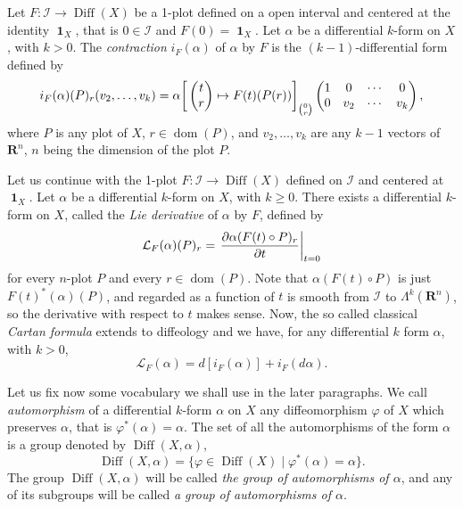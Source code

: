 \documentclass[10pt,reqno,twoside]{amsart}
\newcommand{\mymatrix}[1]{\begin{pmatrix} #1 \end{pmatrix}}
\newcommand{\RR}{\mathbf{R}}
\newcommand{\cI}{\mathcal{I}}
\DeclareMathOperator{\dom}{dom}
\DeclareMathOperator{\id}{\mathbf{1}}
\DeclareMathOperator{\Diff}{Diff}
\newcommand{\DLie}{\mathcal{L}} %
\theoremstyle{plain}
\theoremstyle{definition}
\begin{document}
  Let $F : \cI \to \Diff(X)$ be a 1-plot defined on a open interval and centered at the identity $\id_X$,
  that is $0 \in \cI$ and $F(0) = \id_X$.
  Let $\alpha$ be a differential $k$-form on $X$,
  with $k>0$.
  The {\em contraction} $i_{F}(\alpha)$ of $\alpha$ by $F$ is the $(k-1)$-differential form defined by
  $$
    i_{F}(\alpha)(P)_r(v_2, \ldots, v_{k}) =
    \alpha\bigg[\mymatrix{t \cr r} \mapsto
    F(t)(P(r))\bigg]_{0 \choose r} \mymatrix{1 &
    0 & \cdots & 0 \cr 0 &v_2 & \cdots & v_{k}},
    $$
  where $P$ is any plot of $X$,
  $r \in \dom(P)$,
  and $v_2,\ldots,v_{k}$ are any $k-1$ vectors of $\RR^n$,
  $n$ being the dimension of the plot $P$.
  
  Let us continue with the 1-plot $F : \cI \to \Diff(X)$ defined on $\cI$ and centered at $\id_X$.
  Let $\alpha$ be a differential $k$-form on $X$,
  with $k \geq 0$.
  There exists a differential $k$-form on $X$,
  called the {\em Lie derivative} of $\alpha$ by $F$,
  defined by
  $$
    \DLie_F(\alpha)(P)_r =
    \left.{\partial
    \alpha(F(t) \circ P)_r \over \partial t}\right|_{t=0}
    $$
  for every $n$-plot $P$ and every $r \in \dom(P)$.
  Note that $\alpha(F(t) \circ P)$ is just $F(t)^*(\alpha)(P)$,
  and regarded as a function of $t$ is smooth from $\cI$ to $\Lambda^k(\RR^n)$,
  so the derivative with respect to $t$ makes sense.
  Now,
  the so called classical {\em Cartan formula} extends to diffeology and we have,
  for any differential $k$ form $\alpha$,
  with $k>0$,
  $$
    \DLie_F(\alpha) = d[i_F(\alpha)] + i_F(d\alpha).
    $$
  
  Let us fix now some vocabulary we shall use in the later paragraphs.
  We call {\em automorphism} of a differential $k$-form $\alpha$ on $X$ any diffeomorphism $\varphi$ of $X$ which preserves $\alpha$,
  that is $\varphi^*(\alpha) = \alpha$.
  The set of all the automorphisms of the form $\alpha$ is a group denoted by $\Diff(X,\alpha)$,
  $$
    \Diff(X,\alpha) = \{ \varphi \in \Diff(X) \mid \varphi^*(\alpha) = \alpha \}.
    $$
  The group $\Diff(X,\alpha)$ will be called {\em the group of automorphisms of $\alpha$},
  and any of its subgroups will be called {\em a group of automorphisms of $\alpha$}.
  
\end{document}
